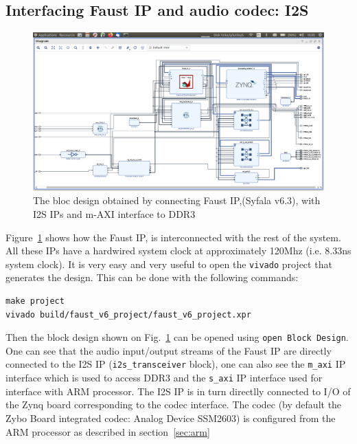 \documentclass[11pt]{article}
\numberwithin{equation}{section}
\numberwithin{figure}{section}
\newcommand{\syfala}{{Syfala}\xspace}
\begin{document}
\subsection{Interfacing Faust IP and audio codec: I2S}
\begin{figure}[ht]
  \centerline{\includegraphics[width=16cm]{design_v6_3.pdf}}
  \caption{The bloc design obtained by connecting Faust IP,(\syfala v6.3), with I2S IPs and m-AXI interface to DDR3}
  \label{fig:design_6_3}
\end{figure}

Figure~\ref{fig:design_6_3} shows how the Faust IP, is interconnected with the rest of the system. All these IPs have a hardwired system clock at approximately 120Mhz (i.e. 8.33ns system clock). It is very easy and very useful to open the {\tt vivado} project that generates the design. This can be done with the following commands:\\
\begin{verbatim}
make project
vivado build/faust_v6_project/faust_v6_project.xpr
\end{verbatim}
Then the  block design shown on Fig.~\ref{fig:design_6_3} can be opened using {\tt open Block Design}. One can see that the audio input/output streams of the Faust IP are directly connected to the I2S IP ({\tt i2s\_transceiver} block), one can also see the {\tt m\_axi} IP interface which is used to access DDR3 and the {\tt s\_axi} IP interface used for interface with ARM processor.  The I2S IP is in turn directlly connected to I/O of the Zynq board corresponding to the codec interface. The codec (by default the Zybo Board  integrated codec: Analog Device SSM2603) is configured from the ARM processor as described in section~\ref{sec:arm}



\end{document}
